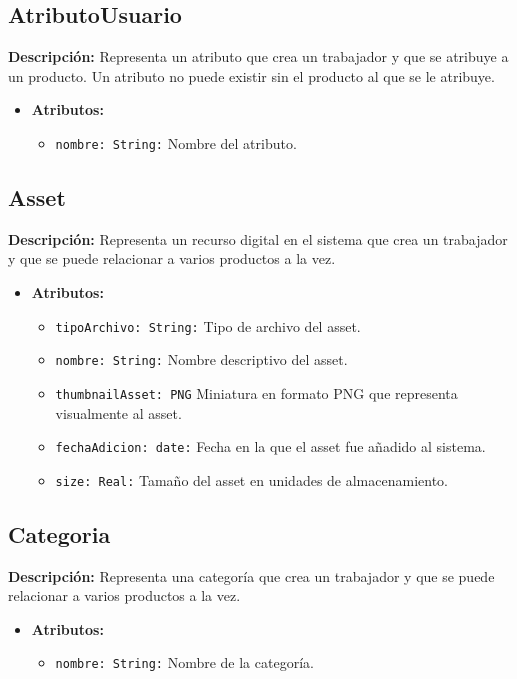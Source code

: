 \documentclass[12pt.a4paper]{article}
\begin{document}
\subsection{AtributoUsuario}
\textbf{Descripción:} Representa un atributo que crea un trabajador y que se atribuye a un producto. Un atributo no puede existir sin el producto al que se le atribuye.
    \begin{itemize}
        \item {\textbf{Atributos:}}
        \begin{itemize}
            \item \texttt{nombre: String:} Nombre del atributo.
        \end{itemize}
    \end{itemize}

\subsection{Asset}
\textbf{Descripción:} Representa un recurso digital en el sistema que crea un trabajador y que se puede relacionar a varios productos a la vez.
    \begin{itemize}
        \item {\textbf{Atributos:}}
        \begin{itemize}
            \item \texttt{tipoArchivo: String:} Tipo de archivo del asset.
            \item \texttt{nombre: String:} Nombre descriptivo del asset.
            \item \texttt{thumbnailAsset: PNG} Miniatura en formato PNG que representa visualmente al asset.
            \item \texttt{fechaAdicion: date:} Fecha en la que el asset fue añadido al sistema.
            \item \texttt{size: Real:} Tamaño del asset en unidades de almacenamiento.
        \end{itemize}
    \end{itemize}

\subsection{Categoria}
\textbf{Descripción:} Representa una categoría que crea un trabajador y que se puede relacionar a varios productos a la vez.
    \begin{itemize}
        \item {\textbf{Atributos:}}
        \begin{itemize}
            \item \texttt{nombre: String:} Nombre de la categoría.
        \end{itemize}
    \end{itemize}
\end{document}
